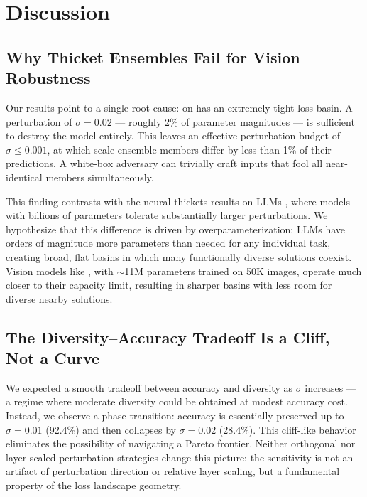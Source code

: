 \section{Discussion}
\label{sec:discussion}

\subsection{Why Thicket Ensembles Fail for Vision Robustness}

Our results point to a single root cause: \resnet on \cifarten has an extremely tight loss basin. A perturbation of $\sigma = 0.02$ --- roughly 2\% of parameter magnitudes --- is sufficient to destroy the model entirely. This leaves an effective perturbation budget of $\sigma \leq 0.001$, at which scale ensemble members differ by less than 1\% of their predictions. A white-box adversary can trivially craft inputs that fool all near-identical members simultaneously.

This finding contrasts with the neural thickets results on LLMs \citep{gan2026neural}, where models with billions of parameters tolerate substantially larger perturbations. We hypothesize that this difference is driven by overparameterization: LLMs have orders of magnitude more parameters than needed for any individual task, creating broad, flat basins in which many functionally diverse solutions coexist. Vision models like \resnet, with $\sim$11M parameters trained on 50K images, operate much closer to their capacity limit, resulting in sharper basins with less room for diverse nearby solutions.

\subsection{The Diversity--Accuracy Tradeoff Is a Cliff, Not a Curve}

We expected a smooth tradeoff between accuracy and diversity as $\sigma$ increases --- a regime where moderate diversity could be obtained at modest accuracy cost. Instead, we observe a phase transition: accuracy is essentially preserved up to $\sigma = 0.01$ (92.4\%) and then collapses by $\sigma = 0.02$ (28.4\%). This cliff-like behavior eliminates the possibility of navigating a Pareto frontier. Neither orthogonal nor layer-scaled perturbation strategies change this picture: the sensitivity is not an artifact of perturbation direction or relative layer scaling, but a fundamental property of the loss landscape geometry.

